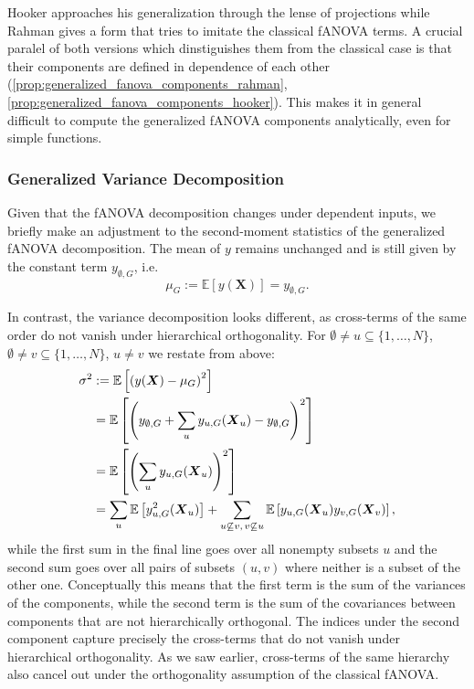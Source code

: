 Hooker approaches his generalization through the lense of projections while Rahman gives a form that tries to imitate the classical fANOVA terms. A crucial paralel of both versions which dinstiguishes them from the classical case is that their components are defined in dependence of each other (\autoref{prop:generalized_fanova_components_rahman}, \autoref{prop:generalized_fanova_components_hooker}).
This makes it in general difficult to compute the generalized fANOVA components analytically, even for simple functions.


\subsubsection{Generalized Variance Decomposition}
Given that the fANOVA decomposition changes under dependent inputs, we briefly make an adjustment to the second-moment statistics of the generalized fANOVA decomposition.
The mean of $y$ remains unchanged and is still given by the constant term \( y_{\emptyset,G} \), i.e.
\[
\mu_G := \mathbb{E}[y(\boldsymbol{X})] = y_{\emptyset,G}.
\]

In contrast, the variance decomposition looks different, as cross-terms of the same order do not vanish under hierarchical orthogonality.
For $ \emptyset \neq u \subseteq \{1,\dots,N\}$, $\emptyset \neq v \subseteq \{1,\dots,N\}$, $u \neq v$ we restate from above:
\begin{align}
\sigma^2 
&:= \mathbb{E}\left[ \left( y(\boldsymbol{X}) - \mu_G \right)^2 \right] \notag \\
&= \mathbb{E} \left[ \left( y_{\emptyset,G} + \sum_{u} y_{u,G}(\boldsymbol{X}_u) - y_{\emptyset,G} \right)^2 \right] \notag \\
&= \mathbb{E} \left[ \left( \sum_{u} y_{u,G}(\boldsymbol{X}_u) \right)^2 \right] \notag \\
&= \sum_{u} \mathbb{E} \left[ y_{u,G}^2(\boldsymbol{X}_u) \right]
+ \sum_{\substack{u \not\subseteq v,\, v \not\subseteq u}} 
\mathbb{E} \left[ y_{u,G}(\boldsymbol{X}_u) y_{v,G}(\boldsymbol{X}_v) \right],
\end{align}
while the first sum in the final line goes over all nonempty subsets $u$ and the second sum goes over all pairs of subsets $(u, v)$ where neither is a subset of the other one.
Conceptually this means that the first term is the sum of the variances of the components, while the second term is the sum of the covariances between components that are not hierarchically orthogonal.
The indices under the second component capture precisely the cross-terms that do not vanish under hierarchical orthogonality. As we saw earlier, cross-terms of the same hierarchy also cancel out under the orthogonality assumption of the classical fANOVA.



